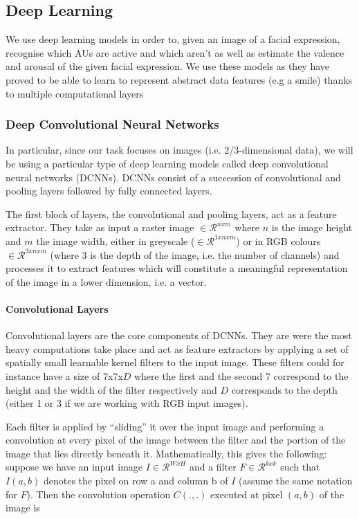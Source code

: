 \documentclass[12pt,twoside]{article}
\begin{document}
\subsection{Deep Learning}

We use deep learning models in order to, given an image of a facial expression,
recognise which AUs are active and which aren't as well as estimate the valence and
arousal of the given facial expression. We use these models as they have proved
to be able to learn to represent abstract data features (e.g a smile) thanks to
multiple computational layers

\subsubsection{Deep Convolutional Neural Networks}

In particular, since our task focuses on images (i.e. 2/3-dimensional data), we
will be using a particular type of deep learning models called deep
convolutional neural networks (DCNNs). DCNNs consist of a succession of 
convolutional and pooling layers followed by fully connected layers.

The first block of layers, the convolutional and pooling layers, act as a feature
extractor. They take as input a raster image $\in \mathcal{R}^{nxm}$ where 
$n$ is the image height and $m$ the image width, either in greyscale ($\in
\mathcal{R}^{1xnxm}$) or in RGB colours $\in \mathcal{R}^{3xnxm}$ 
(where 3 is the depth of the image, i.e. the number of channels) and
processes it to extract features which will constitute a meaningful
representation of the image in a lower dimension, i.e. a vector.

\paragraph{Convolutional Layers}

Convolutional layers are the core components of DCNNs. They are were the most
heavy computations take place and act as feature extractors by applying a set
of spatially small learnable kernel filters to the input image. 
These filters could  for instance have a
size of 7x7x$D$ where the first and the second 7 correspond to the height and the
width of the filter respectively and $D$ corresponds to the depth (either 1 or 3
if we are working with RGB input images).

Each filter is applied by ``sliding'' it over the input image and performing a
convolution at every pixel of the image between the filter and the portion of 
the image that lies directly beneath it. Mathematically, this gives the
following: suppose we have an input image $I \in \mathcal{R}^{WxH}$ and a
filter $F \in \mathcal{R}^{kxk}$ such that $I(a,b)$ denotes the pixel on row
a and column b of $I$ (assume the same notation for $F$). Then the convolution
operation  $C(.,.)$ executed at pixel $(a,b)$ of the image is
\end{document}
